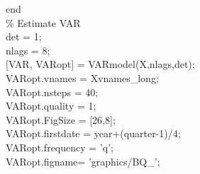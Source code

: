\hspace{1mm}\hspace{5mm} \hspace{5mm} \textcolor{matlabblue}{end} \\ 
\hspace{1mm}\hspace{5mm} \hspace{5mm} \textcolor{matlabgreen}{\% Estimate VAR }\\ 
\hspace{1mm}\hspace{5mm} \hspace{5mm} det = 1; \\ 
\hspace{1mm}\hspace{5mm} \hspace{5mm} nlags = 8; \\ 
\hspace{1mm}\hspace{5mm} \hspace{5mm} [VAR, VARopt] = VARmodel(X,nlags,det); \\ 
\hspace{1mm}\hspace{5mm} \hspace{5mm} VARopt.vnames = Xvnames\_long; \\ 
\hspace{1mm}\hspace{5mm} \hspace{5mm} VARopt.nsteps = 40; \\ 
\hspace{1mm}\hspace{5mm} \hspace{5mm} VARopt.quality = 1; \\ 
\hspace{1mm}\hspace{5mm} \hspace{5mm} VARopt.FigSize = [26,8]; \\ 
\hspace{1mm}\hspace{5mm} \hspace{5mm} VARopt.firstdate = year+(quarter-1)/4; \\ 
\hspace{1mm}\hspace{5mm} \hspace{5mm} VARopt.frequency = \textcolor{matlabpurple}{'q'}; \\ 
\hspace{1mm}\hspace{5mm} \hspace{5mm} VARopt.figname= \textcolor{matlabpurple}{'graphics/BQ\_'}; \\ 
